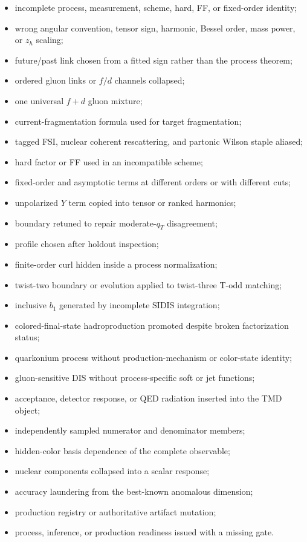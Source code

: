 \documentclass[11pt]{article}
\begin{document}
\begin{itemize}
\item incomplete process, measurement, scheme, hard, FF, or fixed-order identity;
\item wrong angular convention, tensor sign, harmonic, Bessel order, mass power, or \(z_h\) scaling;
\item future/past link chosen from a fitted sign rather than the process theorem;
\item ordered gluon links or \(f/d\) channels collapsed;
\item one universal \(f+d\) gluon mixture;
\item current-fragmentation formula used for target fragmentation;
\item tagged FSI, nuclear coherent rescattering, and partonic Wilson staple aliased;
\item hard factor or FF used in an incompatible scheme;
\item fixed-order and asymptotic terms at different orders or with different cuts;
\item unpolarized \(Y\) term copied into tensor or ranked harmonics;
\item boundary retuned to repair moderate-\(q_T\) disagreement;
\item profile chosen after holdout inspection;
\item finite-order curl hidden inside a process normalization;
\item twist-two boundary or evolution applied to twist-three T-odd matching;
\item inclusive \(b_1\) generated by incomplete SIDIS integration;
\item colored-final-state hadroproduction promoted despite broken factorization status;
\item quarkonium process without production-mechanism or color-state identity;
\item gluon-sensitive DIS without process-specific soft or jet functions;
\item acceptance, detector response, or QED radiation inserted into the TMD object;
\item independently sampled numerator and denominator members;
\item hidden-color basis dependence of the complete observable;
\item nuclear components collapsed into a scalar response;
\item accuracy laundering from the best-known anomalous dimension;
\item production registry or authoritative artifact mutation;
\item process, inference, or production readiness issued with a missing gate.
\end{itemize}
\end{document}
